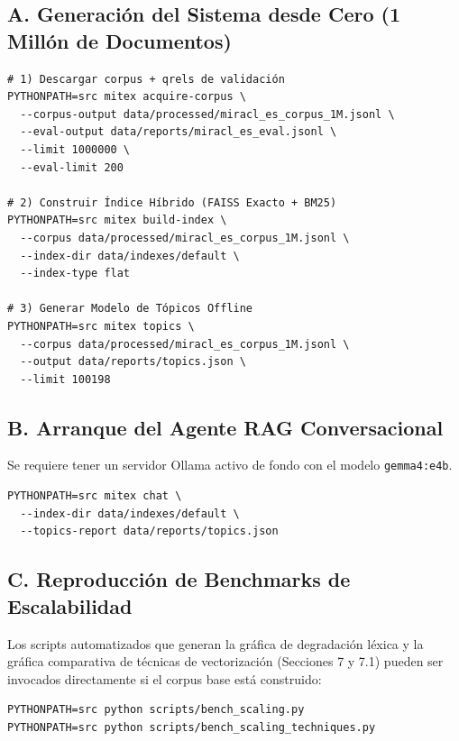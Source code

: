 \documentclass[11pt,a4paper]{article}
\newcommand{\code}[1]{\texttt{#1}}
\begin{document}
\subsection*{A. Generación del Sistema desde Cero (1 Millón de Documentos)}
\begin{verbatim}
# 1) Descargar corpus + qrels de validación
PYTHONPATH=src mitex acquire-corpus \
  --corpus-output data/processed/miracl_es_corpus_1M.jsonl \
  --eval-output data/reports/miracl_es_eval.jsonl \
  --limit 1000000 \
  --eval-limit 200

# 2) Construir Índice Híbrido (FAISS Exacto + BM25)
PYTHONPATH=src mitex build-index \
  --corpus data/processed/miracl_es_corpus_1M.jsonl \
  --index-dir data/indexes/default \
  --index-type flat

# 3) Generar Modelo de Tópicos Offline
PYTHONPATH=src mitex topics \
  --corpus data/processed/miracl_es_corpus_1M.jsonl \
  --output data/reports/topics.json \
  --limit 100198
\end{verbatim}

\subsection*{B. Arranque del Agente RAG Conversacional}
Se requiere tener un servidor Ollama activo de fondo con el modelo \code{gemma4:e4b}.
\begin{verbatim}
PYTHONPATH=src mitex chat \
  --index-dir data/indexes/default \
  --topics-report data/reports/topics.json
\end{verbatim}

\subsection*{C. Reproducción de Benchmarks de Escalabilidad}
Los scripts automatizados que generan la gráfica de degradación léxica y la gráfica comparativa de técnicas de vectorización (Secciones 7 y 7.1) pueden ser invocados directamente si el corpus base está construido:
\begin{verbatim}
PYTHONPATH=src python scripts/bench_scaling.py
PYTHONPATH=src python scripts/bench_scaling_techniques.py
\end{verbatim}
\end{document}
